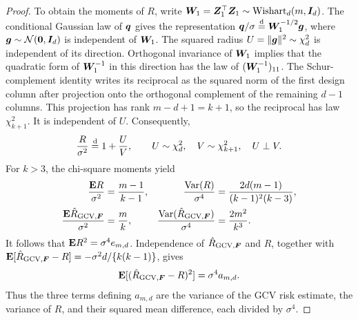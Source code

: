 \documentclass{article}
\theoremstyle{plain} %
\theoremstyle{definition} %
\theoremstyle{definition} %
\newcommand{\GCV}{{\text{GCV}}}
\newcommand{\hR}{\hat{R}}
\begin{document}
\begin{proof}
To obtain the moments of $R$, write
$\boldsymbol{W}_1=\boldsymbol{Z}_1^\top\boldsymbol{Z}_1\sim\operatorname{Wishart}_d(m,\boldsymbol{I}_d)$.
The conditional Gaussian law of $\boldsymbol{q}$ gives the representation
$\boldsymbol{q}/\sigma\stackrel{\rm d}{=}\boldsymbol{W}_1^{-1/2}\boldsymbol{g}$, where
$\boldsymbol{g}\sim{\mathcal N}(\mathbf{0},\boldsymbol{I}_d)$ is independent of $\boldsymbol{W}_1$.
The squared radius $U=\lVert\boldsymbol{g}\rVert^2\sim\chi^2_d$ is independent of its
direction. Orthogonal invariance of $\boldsymbol{W}_1$ implies that the quadratic
form of $\boldsymbol{W}_1^{-1}$ in this direction has the law of
$(\boldsymbol{W}_1^{-1})_{11}$. The Schur-complement identity writes its reciprocal
as the squared norm of the first design column after projection onto the
orthogonal complement of the remaining $d-1$ columns. This projection has
rank $m-d+1=k+1$, so the reciprocal has law $\chi^2_{k+1}$.
It is independent of $U$. Consequently,
\begin{align*}
    \frac{R}{\sigma^2}\stackrel{\rm d}{=}1+\frac UV,
    \qquad U\sim\chi^2_d,\quad V\sim\chi^2_{k+1},
    \quad U\perp V.
\end{align*}
For $k>3$, the chi-square moments yield
\begin{align*}
    \frac{\E R}{\sigma^2}&=\frac{m-1}{k-1},
    &\frac{\operatorname{Var}(R)}{\sigma^4}
       &=\frac{2d(m-1)}{(k-1)^2(k-3)},\\
    \frac{\E\hR_{\GCV,\bF}}{\sigma^2}&=\frac mk,
    &\frac{\operatorname{Var}(\hR_{\GCV,\bF})}{\sigma^4}
       &=\frac{2m^2}{k^3}.
\end{align*}
It follows that ${\mathbf{E}} R^2=\sigma^4e_{m,d}$. Independence of
$\hR_{\GCV,\bF}$ and $R$, together with
$\E[\hR_{\GCV,\bF}-R]=-\sigma^2d/\{k(k-1)\}$, gives
\begin{align*}
    \E[(\hR_{\GCV,\bF}-R)^2]=\sigma^4a_{m,d}.
\end{align*}
Thus the three terms defining $a_{m,d}$ are the variance of the GCV risk
estimate, the variance of $R$, and their squared mean difference, each
divided by $\sigma^4$.


\end{proof}
\end{document}

